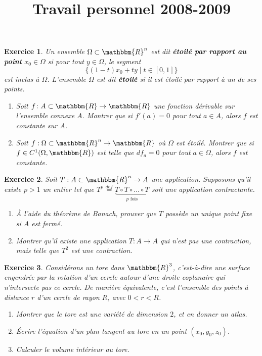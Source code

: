 \documentclass[a4paper,12pt]{article}
\theoremstyle{PourExo}\newtheorem{exercice}{Exercice}
\newcommand{\defe}[2]{ {\bf #1} }
\newcommand{\eR}{\mathbbm{R}}
\begin{document}
\title{Travail personnel 2008-2009}
\maketitle

\begin{exercice}

Un ensemble $\Omega\subset\eR^n$ est dit \defe{étoilé par rapport au point}{Ensemble étoilé} $x_0\in\Omega$ si pour tout $y \in \Omega$, le segment
\begin{equation*}
	\{ (1-t) x_0 + t y \mid t \in  [0,1] \}
\end{equation*}
est inclus à $\Omega$. L'ensemble $\Omega$ est dit \defe{étoilé}{Ensemble étoilé} si il est étoilé par rapport à un de ses points.

\begin{enumerate}
\item
Soit $f\colon A\subset \eR\to\eR$ une fonction dérivable sur l'ensemble connexe $A$. Montrer que si $f'(a)=0$ pour tout $a\in A$, alors $f$ est constante sur $A$.

\item
Soit $f : \Omega \subset \eR^n \to \eR$ où $\Omega$ est étoilé. Montrer que si $f \in C^1(\Omega,{\eR})$ est telle que $df_a = 0$ pour tout $a \in \Omega$, alors $f$ est constante.

\end{enumerate}
\end{exercice}

\begin{exercice}
Soit $T : A \subset {\eR}^n \to A$ une application. Supposons qu'il existe $p > 1$ un entier tel que $T^p \stackrel{def}{=} \underbrace{T \circ T \circ \ldots \circ T}_{\text{$p$ fois}}$ soit une application contractante.

\begin{enumerate}
\item
À l'aide du théorème de Banach, prouver que $T$ possède un unique point fixe si $A$ est fermé.
\item
Montrer qu'il existe une application $T : A \to A$ qui n'est pas une contraction, mais telle que $T^2$ est une contraction.
\end{enumerate}
\end{exercice}

\begin{exercice}
Considérons un tore dans ${\eR}^3$, c'est-à-dire une surface engendrée par la rotation d'un cercle autour d'une droite coplanaire qui n'intersecte pas ce cercle. De manière équivalente, c'est l'ensemble des points à distance $r$ d'un cercle de rayon $R$, avec $0 < r < R$.
\begin{enumerate}
\item
Montrer que le tore est une variété de dimension $2$, et en donner un atlas.
\item
Écrire l'équation d'un plan tangent au tore en un point $(x_0, y_0, z_0)$.
\item
Calculer le volume intérieur au tore.
\end{enumerate}
\end{exercice}
\end{document}
